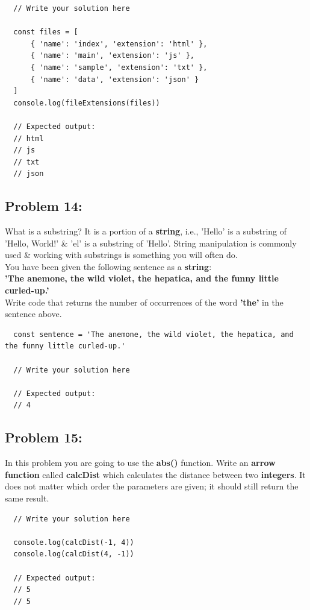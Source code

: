\documentclass{article}
\begin{document}
\begin{verbatim}
  // Write your solution here

  const files = [
      { 'name': 'index', 'extension': 'html' },
      { 'name': 'main', 'extension': 'js' },
      { 'name': 'sample', 'extension': 'txt' },
      { 'name': 'data', 'extension': 'json' }
  ]
  console.log(fileExtensions(files))

  // Expected output:
  // html
  // js
  // txt
  // json
\end{verbatim}

\subsection*{Problem 14:}
What is a substring? It is a portion of a \textbf{string}, i.e., 'Hello' is a substring of 'Hello, World!' \& 'el' is a substring of 'Hello'. String manipulation is commonly used \& working with substrings is something you will often do. \\

You have been given the following sentence as a \textbf{string}: \\

\textbf{'The anemone, the wild violet, the hepatica, and the funny little curled-up.'} \\

Write code that returns the number of occurrences of the word \textbf{'the'} in the sentence above.

\begin{verbatim}
  const sentence = 'The anemone, the wild violet, the hepatica, and the funny little curled-up.'

  // Write your solution here

  // Expected output:
  // 4
\end{verbatim}

\subsection*{Problem 15:}
In this problem you are going to use the \textbf{abs()} function. Write an \textbf{arrow function} called \textbf{calcDist} which calculates the distance between two \textbf{integers}. It does not matter which order the parameters are given; it should still return the same result. 

\begin{verbatim}
  // Write your solution here

  console.log(calcDist(-1, 4))
  console.log(calcDist(4, -1))

  // Expected output:
  // 5
  // 5
\end{verbatim}
\end{document}

